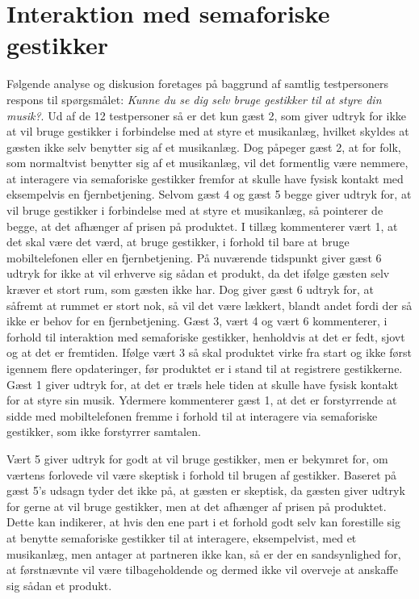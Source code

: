 \section{Interaktion med semaforiske gestikker}
\label{TestresultaterSocialAcceptBrug}
%
Følgende analyse og diskusion foretages på baggrund af samtlig testpersoners respons til spørgsmålet: \textit{Kunne du se dig selv bruge gestikker til at styre din musik?}. \blankline
%
Ud af de 12 testpersoner så er det kun gæst 2, som giver udtryk for ikke at vil bruge gestikker i forbindelse med at styre et musikanlæg, hvilket skyldes at gæsten ikke selv benytter sig af et musikanlæg. Dog påpeger gæst 2, at for folk, som normaltvist benytter sig af et musikanlæg, vil det formentlig være nemmere, at interagere via semaforiske gestikker fremfor at skulle have fysisk kontakt med eksempelvis en fjernbetjening. Selvom gæst 4 og gæst 5 begge giver udtryk for, at vil bruge gestikker i forbindelse med at styre et musikanlæg, så pointerer de begge, at det afhænger af prisen på produktet. I tillæg kommenterer vært 1, at det skal være det værd, at bruge gestikker, i forhold til bare at bruge mobiltelefonen eller en fjernbetjening. På nuværende tidspunkt giver gæst 6 udtryk for ikke at vil erhverve sig sådan et produkt, da det ifølge gæsten selv kræver et stort rum, som gæsten ikke har. Dog giver gæst 6 udtryk for, at såfremt at rummet er stort nok, så vil det være lækkert, blandt andet fordi der så ikke er behov for en fjernbetjening. Gæst 3, vært 4 og vært 6 kommenterer, i forhold til interaktion med semaforiske gestikker, henholdvis at det er fedt, sjovt og at det er fremtiden. Ifølge vært 3 så skal produktet virke fra start og ikke først igennem flere opdateringer, før produktet er i stand til at registrere gestikkerne. Gæst 1 giver udtryk for, at det er træls hele tiden at skulle have fysisk kontakt for at styre sin musik. Ydermere kommenterer gæst 1, at det er forstyrrende at sidde med mobiltelefonen fremme i forhold til at interagere via semaforiske gestikker, som ikke forstyrrer samtalen.

Vært 5 giver udtryk for godt at vil bruge gestikker, men er bekymret for, om værtens forlovede vil være skeptisk i forhold til brugen af gestikker. Baseret på gæst 5's udsagn tyder det ikke på, at gæsten er skeptisk, da gæsten giver udtryk for gerne at vil bruge gestikker, men at det afhænger af prisen på produktet. Dette kan indikerer, at hvis den ene part i et forhold godt selv kan forestille sig at benytte semaforiske gestikker til at interagere, eksempelvist, med et musikanlæg, men antager at partneren ikke kan, så er der en sandsynlighed for, at førstnævnte vil være tilbageholdende og dermed ikke vil overveje at anskaffe sig sådan et produkt.    

